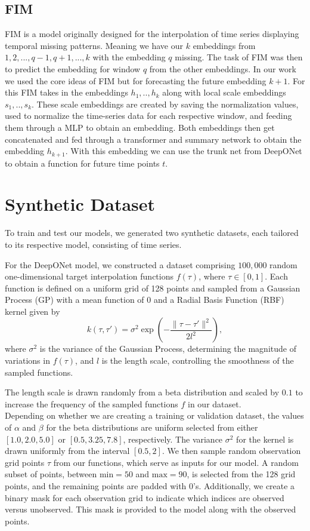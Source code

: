 \documentclass{article}
\theoremstyle{plain}
\theoremstyle{definition}
\theoremstyle{remark}
\begin{document}
\subsection{FIM}\label{sec:FIM_arwin}
FIM\cite{fim-l} is a model originally designed for the interpolation of time series displaying temporal missing patterns. Meaning we have our $k$ embeddings from $1, 2, ..., q-1, q+1, ..., k$ with the embedding $q$ missing. The task of FIM was then to predict the embedding for window $q$ from the other embeddings. In our work we used the core ideas of FIM but for forecasting the future embedding $k+1$. For this FIM takes in the embeddings $h_1, .., h_k$ along with local scale embeddings $s_1, .., s_k$. These scale embeddings are created by saving the normalization values, used to normalize the time-series data for each respective window, and feeding them through a MLP to obtain an embedding. Both embeddings then get concatenated and fed through a transformer and summary network to obtain the embedding $h_{k+1}$. With this embedding we can use the trunk net from DeepONet to obtain a function for future time points $t$.

\section{Synthetic Dataset}
\label{sec:dataset_arwin}
To train and test our models, we generated two synthetic datasets, each tailored to its respective model, consisting of time series.

For the DeepONet model, we constructed a dataset comprising \( 100{,}000 \) random one-dimensional target interpolation functions \( f(\tau) \), where \( \tau \in [0, 1] \). Each function is defined on a uniform grid of 128 points and sampled from a Gaussian Process (GP) with a mean function of \( 0 \) and a Radial Basis Function (RBF) kernel given by
\[
k(\tau, \tau') = \sigma^2 \exp\left(-\frac{\|\tau - \tau'\|^2}{2l^2}\right),
\]
where \( \sigma^2 \) is the variance of the Gaussian Process, determining the magnitude of variations in \( f(\tau) \), and \( l \) is the length scale, controlling the smoothness of the sampled functions.

The length scale is drawn randomly from a beta distribution and scaled by $0.1$ to increase the frequency of the sampled functions $f$ in our dataset.\\
Depending on whether we are creating a training or validation dataset, the values of \(\alpha\) and \(\beta\) for the beta distributions are uniform selected from either \([1.0, 2.0, 5.0]\) or \([0.5, 3.25, 7.8]\), respectively. The variance \(\sigma^2\) for the kernel is drawn uniformly from the interval \([0.5, 2]\).
We then sample random observation grid points \(\tau\) from our functions, which serve as inputs for our model. A random subset of points, between \(\text{min}=50\) and \(\text{max}=90\), is selected from the 128 grid points, and the remaining points are padded with \(0\)'s. Additionally, we create a binary mask for each observation grid to indicate which indices are observed versus unobserved. This mask is provided to the model along with the observed points.
\end{document}
